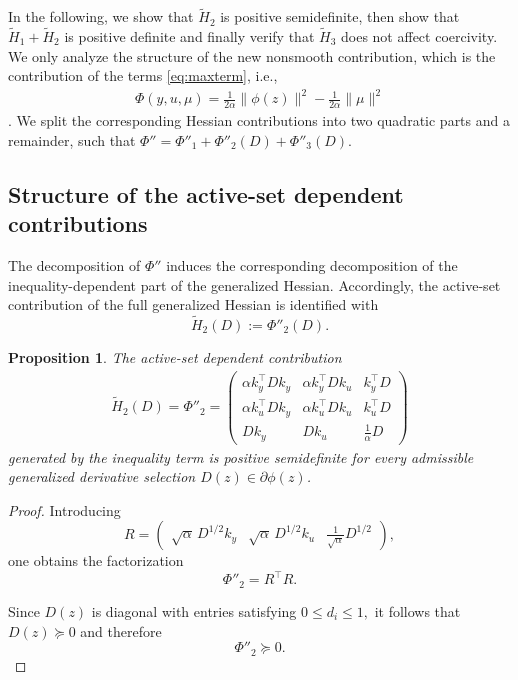 \documentclass[11pt]{article}
\newtheorem{proposition}{Proposition}
\begin{document}
In the following, we show that $\tilde H_2$ is positive semidefinite, then show that $\tilde H_1+\tilde H_2$ is positive definite and finally verify that $\tilde H_3$ does not affect coercivity. We only analyze the structure of the new nonsmooth contribution, which is the contribution of the terms \eqref{eq:maxterm}, i.e., 
\begin{align} 
\Phi(y,u,\mu) = \frac1{2\alpha} \| \phi(z) \|^2 - \frac1{2\alpha}\|\mu\|^2 
\end{align}. 
We split the corresponding Hessian contributions into two quadratic parts and a remainder, such that
$\Phi'' = \Phi''_{1}+\Phi''_{\mathrm{2}}(D)+\Phi''_{\mathrm{3}}(D).$


\subsection{Structure of the active-set dependent contributions}

The decomposition of $\Phi''$ induces the corresponding decomposition of the inequality-dependent part of the generalized Hessian. Accordingly, the active-set contribution of the full generalized Hessian is identified with
\[
\tilde H_2(D):=\Phi''_2(D).
\]

\begin{proposition}
\label{prophtwo}
    The active-set dependent contribution 
    \begin{align}
        \tilde H_2(D) = \Phi''_{2} = \begin{pmatrix} \alpha k_y^\top D k_y & \alpha k_y^\top D k_u & k_y^\top D \\[1ex] \alpha k_u^\top D k_y & \alpha k_u^\top D k_u & k_u^\top D \\[1ex] D k_y & D k_u & \frac1\alpha D \end{pmatrix}
    \end{align} 
    generated by the inequality term is positive semidefinite for every admissible generalized derivative selection $D(z)\in\partial\phi(z)$.
\end{proposition}

\begin{proof}
    Introducing \[ R= \begin{pmatrix} \sqrt{\alpha}\,D^{1/2}k_y & \sqrt{\alpha}\,D^{1/2}k_u & \frac1{\sqrt{\alpha}}D^{1/2} \end{pmatrix}, \] one obtains the factorization \[ \Phi''_{2} = R^\top R. \]

    Since $D(z)$ is diagonal with entries satisfying $ 0\le d_i\le 1, $ it follows that $D(z)\succeq0$ and therefore \[ \Phi''_{2} \succeq0. \]
\end{proof}
\end{document}
